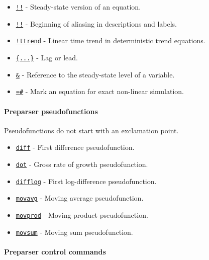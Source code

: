  \begin{itemize}
 \item
   \href{modellang/sstateversion}{\texttt{!!}} - Steady-state version of
   an equation.
 \item
   \href{modellang/alias}{\texttt{!!}} - Beginning of aliasing in
   descriptions and labels.
 \item
   \href{modellang/ttrend}{\texttt{!ttrend}} - Linear time trend in
   deterministic trend equations.
 \item
   \href{modellang/laglead}{\texttt{\{...\}}} - Lag or lead.
 \item
   \href{modellang/sstateref}{\texttt{\&}} - Reference to the
   steady-state level of a variable.
 \item
   \href{modellang/exactnonlin}{\texttt{=\#}} - Mark an equation for
   exact non-linear simulation.
 \end{itemize}
 
 \paragraph{Preparser pseudofunctions}
 
 Pseudofunctions do not start with an exclamation point.
 
 \begin{itemize}
 \item
   \href{modellang/diff}{\texttt{diff}} - First difference
   pseudofunction.
 \item
   \href{modellang/dot}{\texttt{dot}} - Gross rate of growth
   pseudofunction.
 \item
   \href{modellang/difflog}{\texttt{difflog}} - First log-difference
   pseudofunction.
 \item
   \href{modellang/movavg}{\texttt{movavg}} - Moving average
   pseudofunction.
 \item
   \href{modellang/movprod}{\texttt{movprod}} - Moving product
   pseudofunction.
 \item
   \href{modellang/movsum}{\texttt{movsum}} - Moving sum pseudofunction.
 \end{itemize}
 
 \paragraph{Preparser control commands}
 
